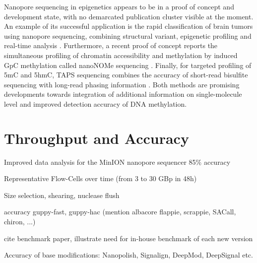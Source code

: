 Nanopore sequencing in epigenetics appears to be in a proof of concept and development state, with no demarcated publication cluster visible at the moment.
An example of its successful application is the rapid classification of brain tumors using nanopore sequencing, combining structural variant, epigenetic profiling and real-time analysis \cite{Euskirchen2017}.
Furthermore, a recent proof of concept reports the simultaneous profiling of chromatin accessibility and methylation by induced GpC methylation called nanoNOMe sequencing \cite{Lee2020}.
Finally, for targeted profiling of 5mC and 5hmC, TAPS sequencing combines the accuracy of short-read bisulfite sequencing with long-read phasing information \cite{Liu2020}.
Both methods are promising developments towards integration of additional information on single-molecule level and improved detection accuracy of DNA methylation.





\section{Throughput and Accuracy}
\label{sec:stat_of_art:throughput}

Improved data analysis for the {MinION} nanopore sequencer \cite{Jain2015} 85\% accuracy

Representative Flow-Cells over time (from 3 to 30 GBp in 48h)

Size selection, shearing, nuclease flush

accuracy guppy-fast, guppy-hac (mention albacore flappie, scrappie, SACall, chiron, ...)

cite benchmark paper, illustrate need for in-house benchmark of each new version

Accuracy of base modifications: Nanopolish, Signalign, DeepMod, DeepSignal etc.


